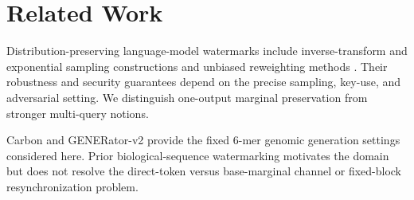 \section{Related Work}

Distribution-preserving language-model watermarks include inverse-transform and exponential sampling constructions \cite{kuditipudi2023robust} and unbiased reweighting methods \cite{hu2024unbiased}. Their robustness and security guarantees depend on the precise sampling, key-use, and adversarial setting. We distinguish one-output marginal preservation from stronger multi-query notions.

Carbon \cite{carbon2026} and GENERator-v2 \cite{generatorv22026} provide the fixed 6-mer genomic generation settings considered here. Prior biological-sequence watermarking motivates the domain but does not resolve the direct-token versus base-marginal channel or fixed-block resynchronization problem.


